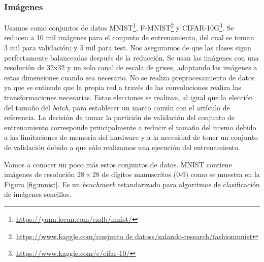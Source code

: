 \subsubsection{Imágenes}

Usamos como conjuntos de datos MNIST\footnote{\url{https://yann.lecun.com/exdb/mnist/}}, F-MNIST\footnote{\url{https://www.kaggle.com/conjunto de datoss/zalando-research/fashionmnist}} y CIFAR-10G\footnote{\url{https://www.kaggle.com/c/cifar-10/}}. Se reducen a 10 mil imágenes para el conjunto de entrenamiento, del cual se toman 3 mil para validación; y 5 mil para test. Nos aseguramos de que las clases sigan perfectamente balanceadas después de la reducción. Se usan las imágenes con una resolución de 32x32 y un solo canal de escala de grises, adaptando las imágenes a estas dimensiones cuando sea necesario. No se realiza preprocesamiento de datos ya que se entiende que la propia red a través de las convoluciones realiza las transformaciones necesarias. Estas elecciones se realizan, al igual que la elección del tamaño del \textit{batch}, para establecer un marco común con el artículo de referencia. La decisión de tomar la partición de validación del conjunto de entrenamiento corresponde principalmente a reducir el tamaño del mismo debido a las limitaciones de memoria del hardware y a la necesidad de tener un conjunto de validación debido a que sólo realizamos una ejecución del entrenamiento.

Vamos a conocer un poco más estos conjuntos de datos. MNIST contiene imágenes de resolución $28 \times 28$ de dígitos manuscritos (0-9) como se muestra en la Figura \ref{fig:mnist}. Es un \textit{benchmark} estandarizado para algoritmos de clasificación de imágenes sencillos.

